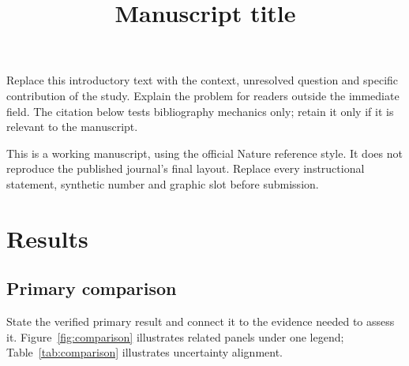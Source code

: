 \documentclass[pdflatex,sn-nature]{sn-jnl}
\begin{document}
\title[Short manuscript title]{Manuscript title}
\author*[1]{ }
\author[1,2]{ }
\maketitle

Replace this introductory text with the context, unresolved question and
specific contribution of the study. Explain the problem for readers outside
the immediate field. The citation below tests bibliography mechanics only;
retain it only if it is relevant to the manuscript\cite{wilkinson2016fair}.

This is a working manuscript, using the official Nature reference style.
It does not reproduce the published journal's final layout. Replace every
instructional statement, synthetic number and graphic slot before submission.

\section{Results}\label{sec:results}
\subsection{Primary comparison}
State the verified primary result and connect it to the evidence needed to
assess it. Figure~\ref{fig:comparison} illustrates related panels under one
legend; Table~\ref{tab:comparison} illustrates uncertainty alignment.
\end{document}
